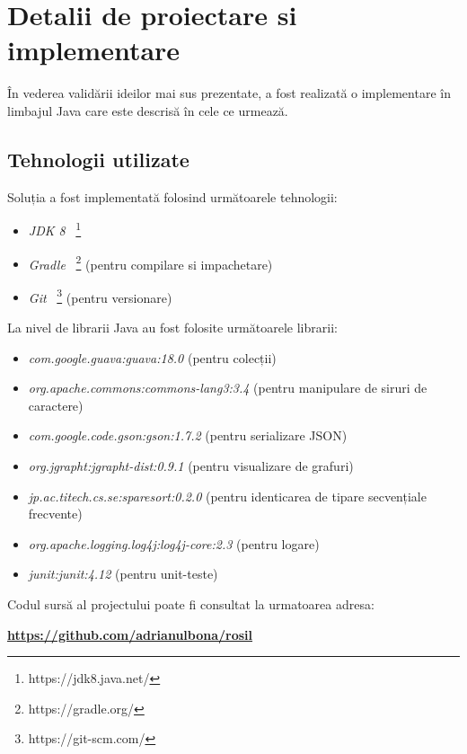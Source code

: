 \chapter{Detalii de proiectare si implementare}

În vederea validării ideilor mai sus prezentate, a fost realizată o implementare în limbajul Java care este descrisă în cele ce urmează.

\section{Tehnologii utilizate}

Soluția a fost implementată folosind următoarele tehnologii:

\begin{itemize}
	\item \textit{JDK 8} ~\footnote{https://jdk8.java.net/}
	\item \textit{Gradle} ~\footnote{https://gradle.org/} (pentru compilare si impachetare)
	\item \textit{Git} ~\footnote{https://git-scm.com/} (pentru versionare)
\end{itemize}

La nivel de librarii Java au fost folosite următoarele librarii:

\begin{itemize}
    \item \textit{com.google.guava:guava:18.0} (pentru colecții)
	\item \textit{org.apache.commons:commons-lang3:3.4} (pentru manipulare de siruri de caractere)
    \item \textit{com.google.code.gson:gson:1.7.2} (pentru serializare JSON)
	\item \textit{org.jgrapht:jgrapht-dist:0.9.1} (pentru visualizare de grafuri)
	\item \textit{jp.ac.titech.cs.se:sparesort:0.2.0} (pentru identicarea de tipare secvențiale frecvente)
	\item \textit{org.apache.logging.log4j:log4j-core:2.3} (pentru logare)
    \item \textit{junit:junit:4.12} (pentru unit-teste)
\end{itemize}

Codul sursă al projectului poate fi consultat la urmatoarea adresa: \begin{center}
\textbf{\href{https://github.com/adrianulbona/rosil}{https://github.com/adrianulbona/rosil}}
\end{center}

